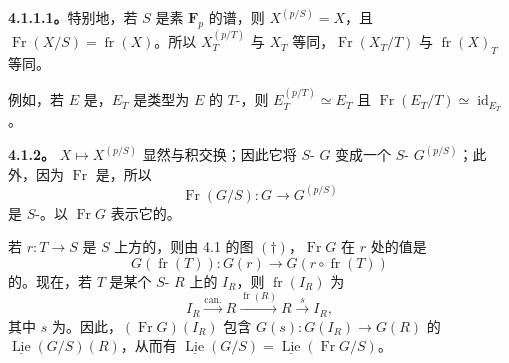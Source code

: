 \textbf{4.1.1.1。}特别地，若 $S$ 是素 $\mathbf F_p$ 的谱，则 $X^{(p/S)}=X$，且 $\operatorname{Fr}(X/S)=\operatorname{fr}(X)$。所以 $X_T^{(p/T)}$ 与 $X_T$ 等同，$\operatorname{Fr}(X_T/T)$ 与 $\operatorname{fr}(X)_T$ 等同。

例如，若 $E$ 是，$E_T$ 是类型为 $E$ 的 $T$-，则 $E_T^{(p/T)}\simeq E_T$ 且 $\operatorname{Fr}(E_T/T)\simeq\operatorname{id}_{E_T}$。

\textbf{4.1.2。} $X\mapsto X^{(p/S)}$ 显然与积交换；因此它将 $S$- $G$ 变成一个 $S$- $G^{(p/S)}$；此外，因为 $\operatorname{Fr}$ 是，所以
\[
\operatorname{Fr}(G/S):G\longrightarrow G^{(p/S)}
\]
是 $S$-。以 $\operatorname{Fr}G$ 表示它的。

若 $r:T\to S$ 是 $S$ 上方的，则由 4.1 的图 $(\dagger)$，$\operatorname{Fr}G$ 在 $r$ 处的值是
\[
G(\operatorname{fr}(T)):G(r)\longrightarrow G(r\circ\operatorname{fr}(T))
\]
的。现在，若 $T$ 是某个 $S$- $R$ 上的 $I_R$，则 $\operatorname{fr}(I_R)$ 为
\[
I_R\xrightarrow{\mathrm{can.}}R\xrightarrow{\operatorname{fr}(R)}R\xrightarrow{s}I_R,
\]
其中 $s$ 为。因此，$(\operatorname{Fr}G)(I_R)$ 包含 $G(s):G(I_R)\to G(R)$ 的 $\underline{\operatorname{Lie}}(G/S)(R)$，从而有
$\underline{\operatorname{Lie}}(G/S)=\underline{\operatorname{Lie}}(\operatorname{Fr}G/S)$。

